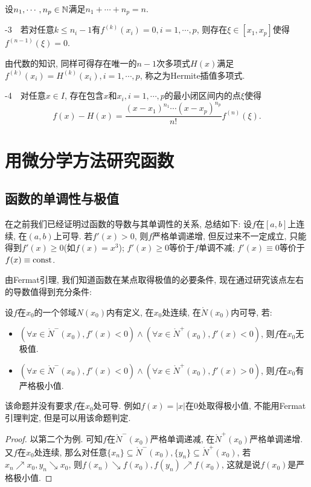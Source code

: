 设$n_1,\cdots ,n_p \in \mathbb{N}$满足$n_1+\cdots +n_p=n$. 
\vspace{1em}

-3~~若对任意$k\leq n_i-1$有$f^{(k)}(x_i)=0, i=1,\cdots ,p$, 则存在$\xi \in [x_1,x_p]$使得$f^{(n-1)}(\xi) = 0$. 
\vspace{1em}

由代数的知识, 同样可得存在唯一的$n-1$次多项式$H(x)$满足$f^{(k)}(x_i)=H^{(k)}(x_i), i=1,\cdots ,p$, 称之为Hermite插值多项式. 
\vspace{1em}

-4~~对任意$x \in I$, 存在包含$x$和$x_i,i=1,\cdots ,p$的最小闭区间内的点$\xi$使得$$f(x) - H(x) = \frac{(x-x_1)^{n_1} \cdots (x-x_p)^{n_p}}{n!} f^{(n)}(\xi). $$


\newpage
\section{用微分学方法研究函数}

\subsection{函数的单调性与极值}

在之前我们已经证明过函数的导数与其单调性的关系, 总结如下: 设$f$在$[a,b]$上连续, 在$(a,b)$上可导. 若$f'(x)>0$, 则$f$严格单调递增, 但反过来不一定成立, 只能得到$f'(x)\geq 0$(如$f(x)=x^3$); $f'(x) \geq 0$等价于$f$单调不减; $f'(x) \equiv 0$等价于$f(x) \equiv {\rm const}$. 

由Fermat引理, 我们知道函数在某点取得极值的必要条件, 现在通过研究该点左右的导数值得到充分条件: 

\begin{proposition}{}
	设$f$在$x_0$的一个邻域$N(x_0)$内有定义, 在$x_0$处连续, 在$\mathring{N}(x_0)$内可导, 若: 
	\begin{itemize}
		\item $(\forall x \in \mathring{N}^-(x_0), f'(x)<0) \wedge (\forall x \in \mathring{N}^+(x_0), f'(x)<0)$, 则$f$在$x_0$无极值. 
		\item $(\forall x \in \mathring{N}^-(x_0), f'(x)<0) \wedge (\forall x \in \mathring{N}^+(x_0), f'(x)>0)$, 则$f$在$x_0$有严格极小值. 
	\end{itemize}
\end{proposition}
\begin{remark}
	该命题并没有要求$f$在$x_0$处可导. 例如$f(x)=|x|$在$0$处取得极小值, 不能用Fermat引理判定, 但是可以用该命题判定. 
\end{remark}
\begin{proof}
	以第二个为例. 可知$f$在$\mathring{N}^-(x_0)$严格单调递减, 在$\mathring{N}^+(x_0)$严格单调递增. 又$f$在$x_0$处连续, 那么对任意$\{ x_n \} \subseteq \mathring{N}^-(x_0),\{ y_n \} \subseteq \mathring{N}^+(x_0)$, 若$x_n \nearrow x_0, y_n \searrow x_0$, 则$f(x_n) \searrow f(x_0), f(y_n) \nearrow f(x_0)$, 这就是说$f(x_0)$是严格极小值. 
\end{proof}

